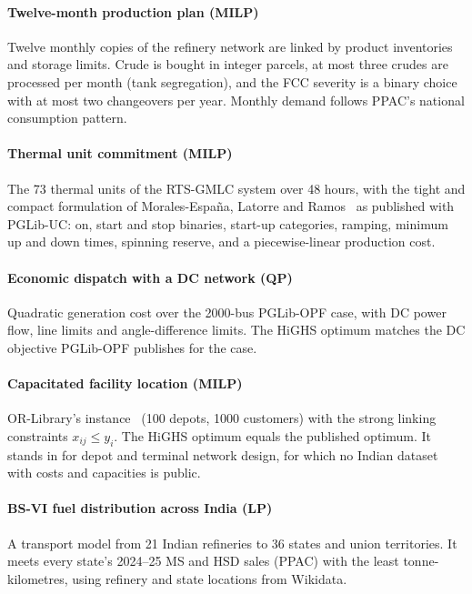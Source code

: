 \paragraph{Twelve-month production plan (MILP)}
Twelve monthly copies of the refinery network are linked by product inventories and storage limits.
Crude is bought in integer parcels, at most three crudes are processed per month (tank segregation),
and the FCC severity is a binary choice with at most two changeovers per year. Monthly demand follows
PPAC's national consumption pattern.

\paragraph{Thermal unit commitment (MILP)}
The 73 thermal units of the RTS-GMLC system over 48 hours, with the tight and compact formulation of
Morales-España, Latorre and Ramos~\cite{moralesespana2013} as published with PGLib-UC: on, start and
stop binaries, start-up categories, ramping, minimum up and down times, spinning reserve, and a
piecewise-linear production cost.

\paragraph{Economic dispatch with a DC network (QP)}
Quadratic generation cost over the 2000-bus PGLib-OPF case, with DC power flow, line limits and
angle-difference limits. The HiGHS optimum matches the DC objective PGLib-OPF publishes for the case.

\paragraph{Capacitated facility location (MILP)}
OR-Library's  instance~\cite{beasley1990} (100 depots, 1000 customers) with the strong
linking constraints $x_{ij}\le y_i$. The HiGHS optimum equals the published optimum. It stands in for
depot and terminal network design, for which no Indian dataset with costs and capacities is public.

\paragraph{BS-VI fuel distribution across India (LP)}
A transport model from 21 Indian refineries to 36 states and union territories. It meets every state's
2024--25 MS and HSD sales (PPAC) with the least tonne-kilometres, using refinery and state locations
from Wikidata.

